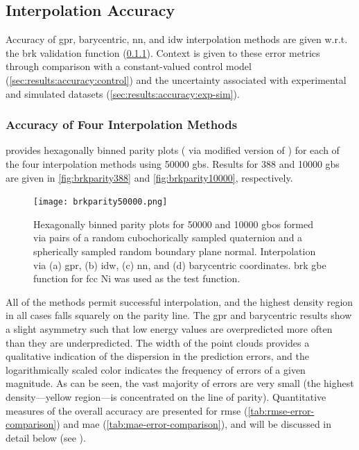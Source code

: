 \documentclass[final,twocolumn,12pt]{elsarticle}
\begin{document}
\subsection{Interpolation Accuracy}
\label{sec:results:accuracy}

Accuracy of \gls{gpr}, barycentric, \gls{nn}, and \gls{idw} interpolation methods are given w.r.t. the \gls{brk} validation function (\cref{sec:results:accuracy:interp}). Context is given to these error metrics through comparison with a constant-valued control model (\cref{sec:results:accuracy:control}) and the uncertainty associated with experimental and simulated datasets (\cref{sec:results:accuracy:exp-sim}).

\subsubsection{Accuracy of Four Interpolation Methods}
\label{sec:results:accuracy:interp}
 provides hexagonally binned parity plots ( via modified version of \cite{beanHexscatter2020}) for each of the four interpolation methods using \num{50000} \inpt{} \glspl{gb}. Results for \num{388} and \num{10000} \glspl{gb} are given in \cref{fig:brkparity388} and \cref{fig:brkparity10000}, respectively.
\begin{figure}[!ht]
    \centering
    \texttt{[image: brkparity50000.png]}
    \caption{Hexagonally binned parity plots for \num{50000} \inpt{} and \num{10000} \outpt{} \glspl{gbo} formed via pairs of a random cubochorically sampled quaternion and a spherically sampled random boundary plane normal. Interpolation via (a) \gls{gpr}, (b) \gls{idw}, (c) \gls{nn}, and (d) barycentric coordinates.  \gls{brk} \gls{gbe} function for \gls{fcc} Ni \cite{bulatovGrainBoundaryEnergy2014} was used as the test function.}
    \label{fig:brkparity50000}
\end{figure}

All of the methods permit successful interpolation, and the highest density region in all cases falls squarely on the parity line. The \gls{gpr} and barycentric results show a slight asymmetry such that low energy values are overpredicted more often than they are underpredicted. The width of the point clouds provides a qualitative indication of the dispersion in the prediction errors, and the logarithmically scaled color indicates the frequency of errors of a given magnitude. As can be seen, the vast majority of errors are very small (the highest density---yellow region---is concentrated on the line of parity). Quantitative measures of the overall accuracy are presented for \gls{rmse} (\cref{tab:rmse-error-comparison}) and \gls{mae} (\cref{tab:mae-error-comparison}), and will be discussed in detail below (see ).
\end{document}
